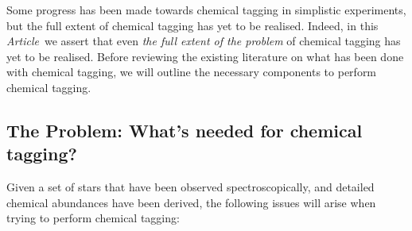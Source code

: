 \documentclass{aastex61}
\newcommand{\article}{\emph{Article}}
\begin{document}
Some progress has been made towards chemical tagging in simplistic experiments, 
but the full extent of chemical tagging has yet to be realised. Indeed, in this 
\article\ we assert that even \emph{the full extent of the problem} of chemical 
tagging has yet to be realised. Before reviewing the existing literature on
what has been done with chemical tagging, we will outline the necessary
components to perform chemical tagging.


\subsection{The Problem: What's needed for chemical tagging?}
\label{section:the-problem}

Given a set of stars that have been observed spectroscopically, and detailed
chemical abundances have been derived, the following issues will arise when
trying to perform chemical tagging:
\end{document}
